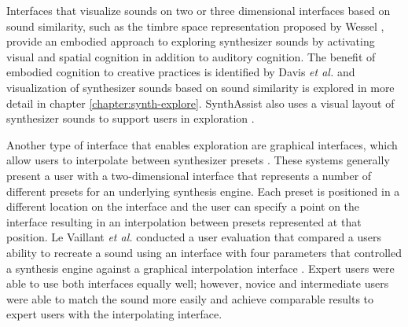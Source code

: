 Interfaces that visualize sounds on two or three dimensional interfaces based on sound similarity, such as the timbre space representation proposed by Wessel \cite{wessel1979timbre}, provide an embodied approach to exploring synthesizer sounds by activating visual and spatial cognition in addition to auditory cognition. The benefit of embodied cognition to creative practices is identified by Davis \textit{et al.} \cite{davis2013toward} and visualization of synthesizer sounds based on sound similarity is explored in more detail in chapter \ref{chapter:synth-explore}. SynthAssist also uses a visual layout of synthesizer sounds to support users in exploration \cite{cartwright2014synthassist}.

Another type of interface that enables exploration are graphical interfaces, which allow users to interpolate between synthesizer presets \cite{gibson2020analyzing}. These systems generally present a user with a two-dimensional interface that represents a number of different presets for an underlying synthesis engine. Each preset is positioned in a different location on the interface and the user can specify a point on the interface resulting in an interpolation between presets represented at that position. Le Vaillant \textit{et al.} conducted a user evaluation that compared a users ability to recreate a sound using an interface with four parameters that controlled a synthesis engine against a graphical interpolation interface \cite{le2020analytic}. Expert users were able to use both interfaces equally well; however, novice and intermediate users were able to match the sound more easily and achieve comparable results to expert users with the interpolating interface.


